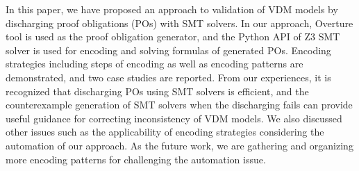 In this paper, we have proposed an approach to validation of VDM models by discharging proof obligations (POs) with SMT solvers. In our approach, Overture tool is used as the proof obligation generator, and the Python API of Z3 SMT solver is used for encoding and solving formulas of generated POs. Encoding strategies including steps of encoding as well as encoding patterns are demonstrated, and two case studies are reported. From our experiences, it is recognized that discharging POs using SMT solvers is efficient, and the counterexample generation of SMT solvers when the discharging fails can provide useful guidance for correcting inconsistency of VDM models. We also discussed other issues such as the applicability of encoding strategies considering the automation of our approach. As the future work, we are gathering and organizing more encoding patterns for challenging the automation issue. 
